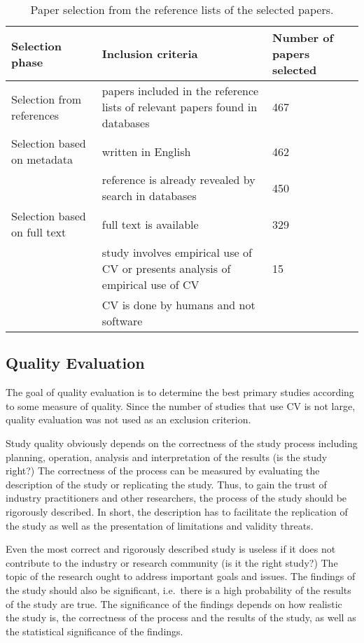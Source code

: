 
%
\begin{table}
	\scriptsize
\caption{\label{tab:Paper-Selection-from}Paper selection from the reference lists of the selected papers.}

\begin{tabular}{|>{\raggedright}p{}|>{\raggedright}p{}|>{\raggedright}p{}|}
\hline 
Selection phase & Inclusion criteria & Number of papers selected\tabularnewline
\hline\hline
Selection from references & papers included in the reference lists of relevant papers found in databases & 467 \tabularnewline
\hline 


Selection based on metadata & written in English & 462 \tabularnewline
\cline{2-3}
& reference is already revealed by search in databases & 450 \tabularnewline
\hline
Selection based on full text & full text is available  & 329 \tabularnewline
\cline{2-3}
& study involves empirical use of CV or presents analysis of empirical use of CV & 15 \tabularnewline
\cline{2-2}
& CV is done by humans and not software & \tabularnewline
\hline


\end{tabular}%
\end{table}


\subsection{\label{QE}Quality Evaluation}
The goal of quality evaluation is to determine the best primary studies according to some measure of quality.
Since the number of studies that use CV is not large, quality evaluation was not used as an exclusion criterion.

Study quality obviously depends on the correctness of the study process including planning, operation, analysis and interpretation of the results (is the study right?) The correctness of the process can be measured by evaluating the description of the study or replicating the study. Thus, to gain the trust of industry practitioners and other researchers, the process of the study should be rigorously described. In short, the description has to  facilitate the replication of the study as well as the presentation of limitations and validity threats.

Even the most correct and rigorously described study is useless if it does not contribute to the industry or research community (is it the right study?) The topic of the research ought to address important goals and issues. The findings of the study should also be significant, i.e.\ there is a high probability of the results of the study are true. The significance of the findings depends on how realistic the study is, the correctness of the process and the results of the study, as well as the statistical significance of the findings.

